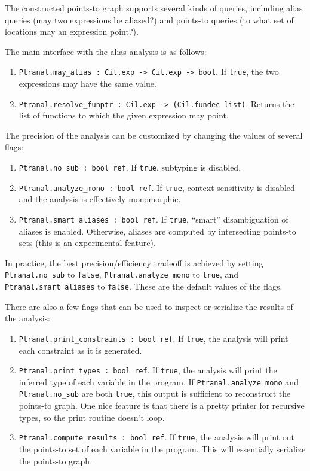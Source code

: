 \documentclass{article}
\def\t#1{{\tt #1}}
\begin{document}
The constructed points-to graph supports several kinds of queries,
including alias queries (may two expressions be aliased?) and
points-to queries (to what set of locations may an expression point?).

The main interface with the alias analysis is as follows:
\begin{enumerate}
\item \t{Ptranal.may\_alias : Cil.exp -> Cil.exp -> bool}. If \t{true}, the
two expressions may have the same value. 
\item \t{Ptranal.resolve\_funptr : Cil.exp -> (Cil.fundec list)}. Returns
the list of functions to which the given expression may point. 
\end{enumerate} 

The precision of the analysis can be customized by changing the values
of several flags:

\begin{enumerate}
\item \t{Ptranal.no\_sub : bool ref}. If \t{true}, subtyping is
disabled.
\item \t{Ptranal.analyze\_mono : bool ref}. If \t{true}, context
sensitivity is disabled and the analysis is effectively monomorphic.
\item \t{Ptranal.smart\_aliases : bool ref}. If \t{true}, ``smart''
disambiguation of aliases is enabled. Otherwise, aliases are computed
by intersecting points-to sets (this is an experimental feature).
\end{enumerate}

In practice, the best precision/efficiency tradeoff is achieved by
setting \t{Ptranal.no\_sub} to \t{false}, \t{Ptranal.analyze\_mono} to
\t{true}, and \t{Ptranal.smart\_aliases} to \t{false}. These are the
default values of the flags.

There are also a few flags that can be used to inspect or serialize
the results of the analysis:

\begin{enumerate}
\item \t{Ptranal.print\_constraints : bool ref}. If \t{true}, the
analysis will print each constraint as it is generated.
\item \t{Ptranal.print\_types : bool ref}. If \t{true}, the analysis
will print the inferred type of each variable in the program. If
\t{Ptranal.analyze\_mono} and \t{Ptranal.no\_sub} are both \t{true},
this output is sufficient to reconstruct the points-to graph. One nice
feature is that there is a pretty printer for recursive types, so the
print routine doesn't loop.
\item \t{Ptranal.compute\_results : bool ref}. If \t{true}, the
analysis will print out the points-to set of each variable in the
program. This will essentially serialize the points-to graph.
\end{enumerate}
\end{document}
